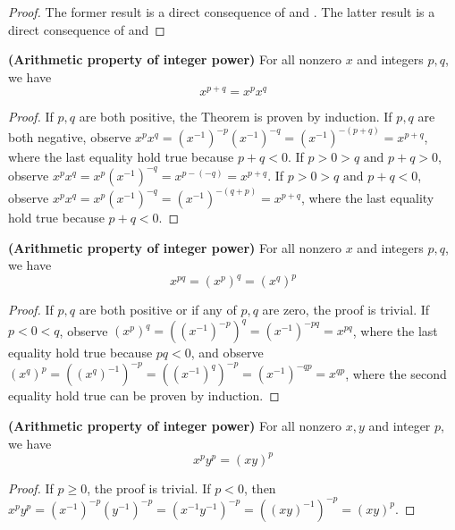 \documentclass{report}
\begin{document}
\begin{proof}
The former result is a direct consequence of  and . The latter result is a direct consequence of  and   
\end{proof}
\begin{theorem}  
\label{1.2.12}
 \textbf{(Arithmetic property of integer power)} For all nonzero $x$ and integers $p,q$, we have 
 \begin{equation}
x^{p+q}=x^px^{q}
\end{equation}
\end{theorem}
\begin{proof}
  If $p,q$ are both positive, the Theorem is proven by induction. If $p,q$ are both negative, observe $x^px^q=(x^{-1})^{-p}(x^{-1})^{-q}=(x^{-1})^{-(p+q)}=x^{p+q}$, where the last equality hold true because $p+q<0$. If $p>0>q\text{ and }p+q>0$, observe $x^px^q=x^p(x^{-1})^{-q}=x^{p-(-q)}=x^{p+q}$. If $p>0>q\text{ and }p+q<0$, observe $x^px^q=x^p(x^{-1})^{-q}=(x^{-1})^{-(q+p)}=x^{p+q}$, where the last equality hold true because $p+q<0.$ 
\end{proof}
\begin{theorem}
\label{1.2.13}
\textbf{(Arithmetic property of integer power)} For all nonzero $x$ and integers $p,q$, we have
\begin{equation}
  x^{pq}=(x^p)^q=(x^q)^p
\end{equation}
\end{theorem}
\begin{proof}
  If $p,q$ are both positive or if any of $p,q$ are zero, the proof is trivial. If $p<0<q$, observe $(x^p)^q=((x^{-1})^{-p})^q=(x^{-1})^{-pq}=x^{pq}$, where the last equality hold true because $pq<0$, and observe $(x^q)^p=((x^q)^{-1})^{-p}=((x^{-1})^{q})^{-p}=(x^{-1})^{-qp}=x^{qp}$, where the second equality hold true can be proven by induction.    
\end{proof}
\begin{theorem}
\label{1.2.14}
\textbf{(Arithmetic property of integer power)} For all nonzero $x,y$ and integer  $p$, we have
 \begin{equation}
x^py^p=(xy)^p
\end{equation}
\end{theorem}
\begin{proof}
If $p\geq 0$, the proof is trivial. If $p<0$, then $x^py^p=(x^{-1})^{-p}(y^{-1})^{-p}=(x^{-1}y^{-1})^{-p}=((xy)^{-1})^{-p}=(xy)^p$.
\end{proof}
\end{document}
